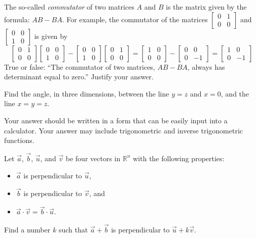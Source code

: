 \documentclass[addpoints]{exam}
\newcommand{\R}{\mathbb{R}}
\begin{document}
\begin{questions}
\question[5] The so-called \emph{commutator} of two matrices $A$ and $B$ is the matrix given by the formula: $AB-BA$. For example, the commutator of the matrices $\left[\begin{smallmatrix}0&1\\0&0\end{smallmatrix}\right]$ and $\left[\begin{smallmatrix}0&0\\1&0\end{smallmatrix}\right]$ is given by
\[\begin{bmatrix}0&1\\0&0\end{bmatrix}\begin{bmatrix}0&0\\1&0\end{bmatrix}
-\begin{bmatrix}0&0\\1&0\end{bmatrix}\begin{bmatrix}0&1\\0&0\end{bmatrix}
=\begin{bmatrix}1&0\\0&0\end{bmatrix}-\begin{bmatrix}0&0\\0&-1\end{bmatrix}=\begin{bmatrix}1&0\\0&-1\end{bmatrix}\]
 True or false: ``The commutator of two matrices, $AB-BA$, always has determinant equal to zero.'' Justify your answer.
 
\question[5] Find the angle, in three dimensions, between the line $y=z$ and $x=0$, and the line $x=y=z$.

Your answer should be written in a form that can be easily input into a calculator. Your answer may include trigonometric and inverse trigonometric functions.

\question[5] Let $\vec a$, $\vec b$, $\vec u$, and $\vec v$ be four vectors in $\R^n$ with the following properties:
\begin{itemize}
\item $\vec a$ is perpendicular to $\vec u$,
\item $\vec b$ is perpendicular to $\vec v$, and
\item $\vec a \cdot \vec v =\vec b \cdot \vec u$.
\end{itemize}
Find a number $k$ such that $\vec a + \vec b$ is perpendicular to $\vec u + k \vec v$.



\end{questions}
\end{document}
